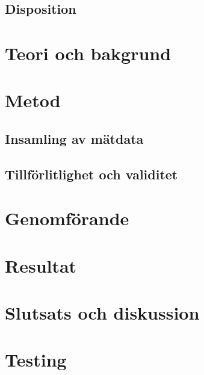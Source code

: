 \subsection{Disposition}

\clearpage
\section{Teori och bakgrund}

\clearpage
\section{Metod}

\subsection{Insamling av mätdata}
\subsection{Tillförlitlighet och validitet}

\clearpage
\section{Genomförande}

\clearpage
\section{Resultat}

\clearpage
\section{Slutsats och diskussion}


\bilagor
\section{Testing}

\preenddocument

